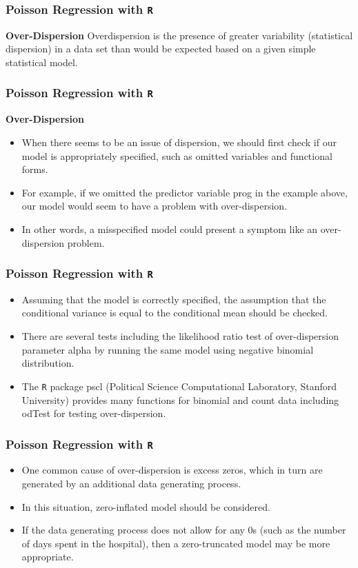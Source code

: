\documentclass[00-GLMregslides.tex]{subfiles}
\begin{document}
\begin{frame}[fragile]

\frametitle{Poisson Regression with \texttt{R}}
\Large
\textbf{Over-Dispersion}
Overdispersion is the presence of greater variability
(statistical dispersion) in a data set than would be expected based on a given simple statistical model.
\end{frame}
\begin{frame}[fragile]

\frametitle{Poisson Regression with \texttt{R}}
\Large
\textbf{Over-Dispersion}
\begin{itemize}

 \item When there seems to be an issue of dispersion, we should first check if our model is appropriately specified, 
 such as omitted variables and functional forms. 
 \item For example, if we omitted the predictor variable prog in the example above, our model would seem to have a 
 problem with over-dispersion. 
 \item In other words, a misspecified model could present a symptom like an over-dispersion problem. 
\end{itemize}
\end{frame}
\begin{frame}[fragile]
\frametitle{Poisson Regression with \texttt{R}}
	\Large
\begin{itemize}
\item Assuming that the model is correctly specified, the assumption that the conditional variance is equal 
to the conditional mean should be checked. 
\item There are several tests including the likelihood ratio test of over-dispersion parameter alpha by running the 
same model using negative binomial distribution. 
\item The \texttt{R} package pscl (Political Science Computational Laboratory, Stanford University) provides many functions for binomial 
and count data including odTest for testing over-dispersion. 
\end{itemize}
\end{frame}
\begin{frame}[fragile]
	\frametitle{Poisson Regression with \texttt{R}}
	\Large
	\begin{itemize}
\item One common cause of over-dispersion is excess zeros, which in turn are generated by an additional data generating 
process. 
\item In this situation, zero-inflated model should be considered.
\item If the data generating process does not allow for any 0s (such as the number of days spent in the hospital), then a zero-truncated model may be more appropriate.
\end{itemize}
\end{frame}
\end{document}
